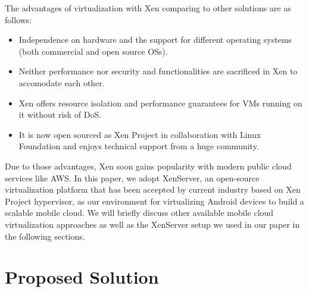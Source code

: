 \documentclass[journal,comsoc]{IEEEtran}
\begin{document}
The advantages of virtualization with Xen comparing to other solutions are as follows:
\begin{itemize}
	\item Independence on hardware and the support for different operating systems (both commercial and open source OSs).
	\item Neither performance nor security and functionalities are sacrificed in Xen to accomodate each other.
	\item Xen offers resource isolation and performance guarantees for VMs running on it without risk of DoS.
	\item It is now open sourced as Xen Project \cite{xenproj} in collaboration with Linux Foundation and enjoys technical support from a huge community.
\end{itemize}

Due to those advantages, Xen soon gains popularity with modern public cloud services like AWS. In this paper, we adopt XenServer\cite{xenserver}, an open-source virtualization platform that has been accepted by current industry based on Xen Project hypervisor, as our environment for virtualizing Android devices to build a scalable mobile cloud. We will briefly discuss other available mobile cloud virtualization approaches as well as the XenServer setup we used in our paper in the following sections. 


\section{Proposed Solution}
\end{document}
